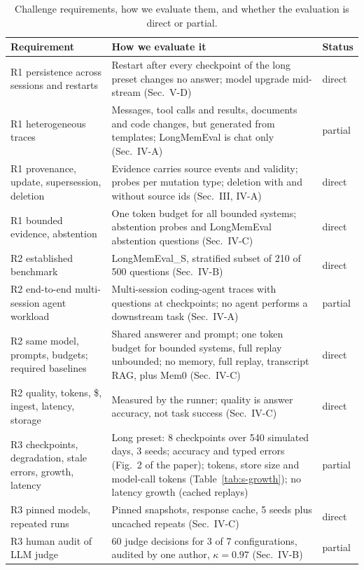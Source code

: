 \documentclass[10pt,conference]{IEEEtran}
\begin{document}
\begin{table}[t]
\caption{Challenge requirements, how we evaluate them, and whether the
evaluation is direct or partial.}
\label{tab:s-req}
\centering
\footnotesize
\begin{tabular}{@{}p{}p{}l@{}}
\toprule
Requirement & How we evaluate it & Status \\
\midrule
R1 persistence across sessions and restarts
  & Restart after every checkpoint of the long preset changes no answer; model
    upgrade mid-stream (Sec.~V-D) & direct \\
R1 heterogeneous traces
  & Messages, tool calls and results, documents and code changes, but
    generated from templates; LongMemEval is chat only (Sec.~IV-A)
  & partial \\
R1 provenance, update, supersession, deletion
  & Evidence carries source events and validity; probes per mutation type;
    deletion with and without source ids (Sec.~III, IV-A) & direct \\
R1 bounded evidence, abstention
  & One token budget for all bounded systems; abstention probes and
    LongMemEval abstention questions (Sec.~IV-C) & direct \\
\midrule
R2 established benchmark
  & LongMemEval\_S, stratified subset of 210 of 500 questions
    (Sec.~IV-B) & direct \\
R2 end-to-end multi-session agent workload
  & Multi-session coding-agent traces with questions at checkpoints; no agent
    performs a downstream task (Sec.~IV-A) & partial \\
R2 same model, prompts, budgets; required baselines
  & Shared answerer and prompt; one token budget for bounded systems, full
    replay unbounded; no memory, full replay, transcript RAG, plus Mem0
    (Sec.~IV-C) & direct \\
R2 quality, tokens, \$, ingest, latency, storage
  & Measured by the runner; quality is answer accuracy, not task success
    (Sec.~IV-C) & direct \\
\midrule
R3 checkpoints, degradation, stale errors, growth, latency
  & Long preset: 8 checkpoints over 540 simulated days, 3 seeds; accuracy and typed errors (Fig.~2 of the paper); tokens, store size and model-call tokens (Table~\ref{tab:s-growth}); no latency growth (cached replays) & partial \\
R3 pinned models, repeated runs
  & Pinned snapshots, response cache, 5 seeds plus uncached repeats
    (Sec.~IV-C) & direct \\
R3 human audit of LLM judge
  & 60 judge decisions for 3 of 7 configurations, audited by one author, $\kappa=0.97$
    (Sec.~IV-B) & partial \\
\bottomrule
\end{tabular}
\end{table}
\end{document}
